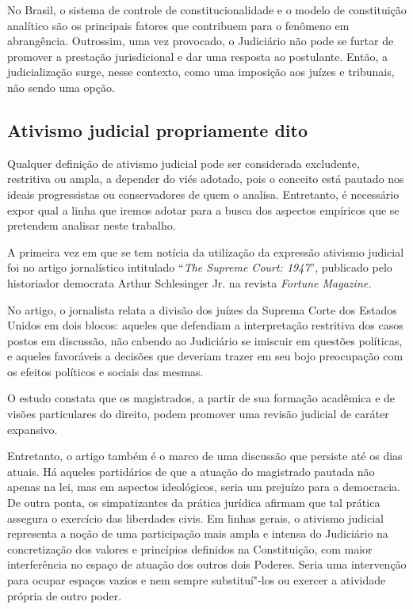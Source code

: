 No Brasil, o sistema de controle de constitucionalidade e o modelo de
constituição analítico são os principais fatores que contribuem para o
fenômeno em abrangência. Outrossim, uma vez provocado, o Judiciário não
pode se furtar de promover a prestação jurisdicional e dar uma resposta
ao postulante. Então, a judicialização surge, nesse contexto, como uma
imposição aos juízes e tribunais, não sendo uma opção.

\subsection{Ativismo judicial propriamente dito}

Qualquer definição de ativismo judicial pode ser considerada excludente,
restritiva ou ampla, a depender do viés adotado, pois o conceito está
pautado nos ideais progressistas ou conservadores de quem o analisa.
Entretanto, é necessário expor qual a linha que iremos adotar para a
busca dos aspectos empíricos que se pretendem analisar neste trabalho.

A primeira vez em que se tem notícia da utilização da expressão ativismo
judicial foi no artigo jornalístico intitulado ``\emph{The Supreme
Court: 1947}'', publicado pelo historiador democrata Arthur Schlesinger
Jr. na revista \emph{Fortune Magazine.}

No artigo, o jornalista relata a divisão dos juízes da Suprema Corte dos
Estados Unidos em dois blocos: aqueles que defendiam a interpretação
restritiva dos casos postos em discussão, não cabendo ao Judiciário se
imiscuir em questões políticas, e aqueles favoráveis a decisões que
deveriam trazer em seu bojo preocupação com os efeitos políticos e
sociais das mesmas.

O estudo constata que os magistrados, a partir de sua formação
acadêmica e de visões particulares do direito, podem promover uma
revisão judicial de caráter expansivo.

Entretanto, o artigo também é o marco de uma discussão que persiste até
os dias atuais. Há aqueles partidários de que a atuação do magistrado
pautada não apenas na lei, mas em aspectos ideológicos, seria um prejuízo
para a democracia. De outra ponta, os simpatizantes da prática jurídica
afirmam que tal prática assegura o exercício das liberdades civis. Em
linhas gerais, o ativismo judicial representa a noção de uma
participação mais ampla e intensa do Judiciário na concretização dos
valores e princípios definidos na Constituição, com maior interferência
no espaço de atuação dos outros dois Poderes. Seria uma intervenção para
ocupar espaços vazios e nem sempre substituí"-los ou exercer a atividade
própria de outro poder.

